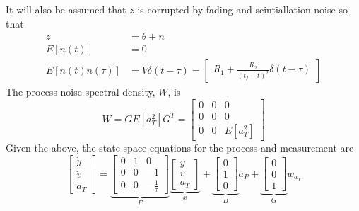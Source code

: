 \documentclass{article}
\begin{document}
It will also be assumed that $z$ is corrupted by fading and scintiallation noise so that
\begin{equation}
    \begin{split}
        z & = \theta + n \\
        E[n(t)] & = 0 \\
        E[n(t)n(\tau)] & = V\delta(t-\tau) = \begin{bmatrix}
            R_1 + \frac{R_2}{(t_f - t)^2}\delta(t-\tau)
        \end{bmatrix}
    \end{split}
\end{equation}
The process noise spectral density, $W$, is 
\begin{equation}
    W = G E[a_T^2] G^T = \begin{bmatrix}
        0 & 0 & 0 \\
        0 & 0 & 0 \\
        0 & 0 & E[a_T^2]
    \end{bmatrix}
\end{equation}
Given the above, the state-space equations for the process and measurement are
\begin{equation}\label{SS_process}
    \begin{bmatrix}
        \dot y \\
        \dot v \\
        \dot a_T
    \end{bmatrix} = 
    \underbrace{
        \begin{bmatrix}
            0 & 1 & 0 \\
            0 & 0 & -1 \\
            0 & 0 & -\frac{1}{\tau}
        \end{bmatrix}
    }_{F} 
    \underbrace{
        \begin{bmatrix}
            y \\
            v \\
            a_T
        \end{bmatrix}
    }_{x} + 
    \underbrace{
        \begin{bmatrix}
            0 \\ 
            1 \\
            0
        \end{bmatrix}
    }_{B} a_P + 
    \underbrace{
        \begin{bmatrix}
            0 \\
            0 \\
            1
        \end{bmatrix}
    }_{G} w_{a_T}
\end{equation}
\end{document}
